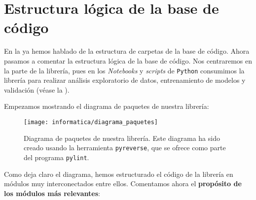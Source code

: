 \section{Estructura lógica de la base de código} \label{isec:estructura_paquetes_modulos}

En la  ya hemos hablado de la estructura de carpetas de la base de código. Ahora pasamos a comentar la estructura lógica de la base de código. Nos centraremos en la parte de la librería, pues en los \textit{Notebooks} y \textit{scripts} de \lstinline{Python} consumimos la librería para realizar análisis exploratorio de datos, entrenamiento de modelos y validación (véase la ).

Empezamos mostrando el diagrama de paquetes de nuestra librería:

\begin{figure}[H]
	\centering
	\texttt{[image: informatica/diagrama\_paquetes]}
	\caption{Diagrama de paquetes de nuestra librería. Este diagrama ha sido creado usando la herramienta \lstinline{pyreverse}, que se ofrece como parte del programa \lstinline{pylint}.}
\end{figure}

Como deja claro el diagrama, hemos estructurado el código de la librería en módulos muy interconectados entre ellos. Comentamos ahora el \textbf{propósito de los módulos más relevantes}:

